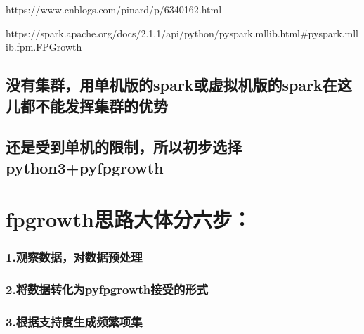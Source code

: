 \documentclass[11pt]{article}
\begin{document}
https://www.cnblogs.com/pinard/p/6340162.html

https://spark.apache.org/docs/2.1.1/api/python/pyspark.mllib.html\#pyspark.mllib.fpm.FPGrowth

\hypertarget{ux6ca1ux6709ux96c6ux7fa4ux7528ux5355ux673aux7248ux7684sparkux6216ux865aux62dfux673aux7248ux7684sparkux5728ux8fd9ux513fux90fdux4e0dux80fdux53d1ux6325ux96c6ux7fa4ux7684ux4f18ux52bf}{%
\subsection{没有集群，用单机版的spark或虚拟机版的spark在这儿都不能发挥集群的优势}\label{ux6ca1ux6709ux96c6ux7fa4ux7528ux5355ux673aux7248ux7684sparkux6216ux865aux62dfux673aux7248ux7684sparkux5728ux8fd9ux513fux90fdux4e0dux80fdux53d1ux6325ux96c6ux7fa4ux7684ux4f18ux52bf}}

\hypertarget{ux8fd8ux662fux53d7ux5230ux5355ux673aux7684ux9650ux5236ux6240ux4ee5ux521dux6b65ux9009ux62e9python3pyfpgrowth}{%
\subsection{还是受到单机的限制，所以初步选择python3+pyfpgrowth}\label{ux8fd8ux662fux53d7ux5230ux5355ux673aux7684ux9650ux5236ux6240ux4ee5ux521dux6b65ux9009ux62e9python3pyfpgrowth}}

    \hypertarget{fpgrowthux601dux8defux5927ux4f53ux5206ux516dux6b65}{%
\section{fpgrowth思路大体分六步：}\label{fpgrowthux601dux8defux5927ux4f53ux5206ux516dux6b65}}

\hypertarget{ux89c2ux5bdfux6570ux636eux5bf9ux6570ux636eux9884ux5904ux7406}{%
\subsubsection{1.观察数据，对数据预处理}\label{ux89c2ux5bdfux6570ux636eux5bf9ux6570ux636eux9884ux5904ux7406}}

\hypertarget{ux5c06ux6570ux636eux8f6cux5316ux4e3apyfpgrowthux63a5ux53d7ux7684ux5f62ux5f0f}{%
\subsubsection{2.将数据转化为pyfpgrowth接受的形式}\label{ux5c06ux6570ux636eux8f6cux5316ux4e3apyfpgrowthux63a5ux53d7ux7684ux5f62ux5f0f}}

\hypertarget{ux6839ux636eux652fux6301ux5ea6ux751fux6210ux9891ux7e41ux9879ux96c6}{%
\subsubsection{3.根据支持度生成频繁项集}\label{ux6839ux636eux652fux6301ux5ea6ux751fux6210ux9891ux7e41ux9879ux96c6}}
\end{document}
